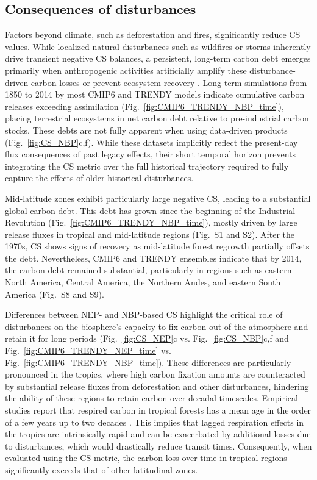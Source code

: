 \documentclass[ProofPDF]{./Styles/Jnls-Template-V3}
\begin{document}
\subsection{Consequences of disturbances}
Factors beyond climate, such as deforestation and fires, significantly reduce CS values. While localized natural disturbances such as wildfires or storms inherently drive transient negative CS balances, a persistent, long-term carbon debt emerges primarily when anthropogenic activities artificially amplify these disturbance-driven carbon losses or prevent ecosystem recovery \citep{de-Miguel2025,Turetsky2015}. Long-term simulations from 1850 to 2014 by most CMIP6 and TRENDY models indicate cumulative carbon releases exceeding assimilation (Fig.~\ref{fig:CMIP6_TRENDY_NBP_time}), placing terrestrial ecosystems in net carbon debt relative to pre-industrial carbon stocks. These debts are not fully apparent when using data-driven products (Fig.~\ref{fig:CS_NBP}c,f). While these datasets implicitly reflect the present-day flux consequences of past legacy effects, their short temporal horizon prevents integrating the CS metric over the full historical trajectory required to fully capture the effects of older historical disturbances. 

Mid-latitude zones exhibit particularly large negative CS, leading to a substantial global carbon debt. This debt has grown since the beginning of the Industrial Revolution (Fig.~\ref{fig:CMIP6_TRENDY_NBP_time}), mostly driven by large release fluxes in tropical and mid-latitude regions (Fig.~S1 and S2). After the 1970s, CS shows signs of recovery as mid-latitude forest regrowth partially offsets the debt. 
Nevertheless, CMIP6 and TRENDY ensembles indicate that by 2014, the carbon debt remained substantial, particularly in regions such as eastern North America, Central America, the Northern Andes, and eastern South America (Fig.~S8 and S9).

Differences between NEP- and NBP-based CS highlight the critical role of disturbances on the biosphere's capacity to fix carbon out of the atmosphere and retain it for long periods (Fig.~\ref{fig:CS_NEP}c vs. Fig.~\ref{fig:CS_NBP}c,f and Fig.~\ref{fig:CMIP6_TRENDY_NEP_time} vs. Fig.~\ref{fig:CMIP6_TRENDY_NBP_time}). These differences are particularly pronounced in the tropics, where high carbon fixation amounts are counteracted by substantial release fluxes from deforestation and other disturbances, hindering the ability of these regions to retain carbon over decadal timescales. Empirical studies report that respired carbon in tropical forests has a mean age in the order of a few years up to two decades \citep{Sierra2021JE,Chanca2025}. This implies that lagged respiration effects in the tropics are intrinsically rapid and can be exacerbated by additional losses due to disturbances, which would drastically reduce transit times. Consequently, when evaluated using the CS metric, the carbon loss over time in tropical regions significantly exceeds that of other latitudinal zones. 
\end{document}
